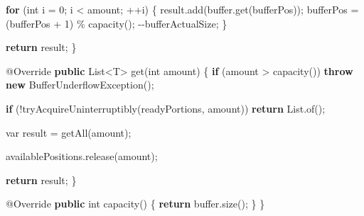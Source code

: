 \documentclass[11pt]{article}
\newenvironment{Shaded}{}{}
\newcommand{\KeywordTok}[1]{\textcolor[rgb]{0.00,0.44,0.13}{\textbf{{#1}}}}
\newcommand{\DataTypeTok}[1]{\textcolor[rgb]{0.56,0.13,0.00}{{#1}}}
\newcommand{\DecValTok}[1]{\textcolor[rgb]{0.25,0.63,0.44}{{#1}}}
\newcommand{\FunctionTok}[1]{\textcolor[rgb]{0.02,0.16,0.49}{{#1}}}
\newcommand{\NormalTok}[1]{{#1}}
\newcommand{\ControlFlowTok}[1]{\textcolor[rgb]{0.00,0.44,0.13}{\textbf{{#1}}}}
\newcommand{\OperatorTok}[1]{\textcolor[rgb]{0.40,0.40,0.40}{{#1}}}
\newcommand{\BuiltInTok}[1]{{#1}}
\newcommand{\AttributeTok}[1]{\textcolor[rgb]{0.49,0.56,0.16}{{#1}}}
\begin{document}
\begin{Shaded}
\begin{Highlighting}[]
        \ControlFlowTok{for} \OperatorTok{(}\DataTypeTok{int}\NormalTok{ i }\OperatorTok{=} \DecValTok{0}\OperatorTok{;}\NormalTok{ i }\OperatorTok{\textless{}}\NormalTok{ amount}\OperatorTok{;} \OperatorTok{++}\NormalTok{i}\OperatorTok{)} \OperatorTok{\{}
\NormalTok{            result}\OperatorTok{.}\FunctionTok{add}\OperatorTok{(}\NormalTok{buffer}\OperatorTok{.}\FunctionTok{get}\OperatorTok{(}\NormalTok{bufferPos}\OperatorTok{));}
\NormalTok{            bufferPos }\OperatorTok{=} \OperatorTok{(}\NormalTok{bufferPos }\OperatorTok{+} \DecValTok{1}\OperatorTok{)} \OperatorTok{\%} \FunctionTok{capacity}\OperatorTok{();}
            \OperatorTok{{-}{-}}\NormalTok{bufferActualSize}\OperatorTok{;}
        \OperatorTok{\}}

        \ControlFlowTok{return}\NormalTok{ result}\OperatorTok{;}
    \OperatorTok{\}}

    \AttributeTok{@Override}
    \KeywordTok{public} \BuiltInTok{List}\OperatorTok{\textless{}}\NormalTok{T}\OperatorTok{\textgreater{}} \FunctionTok{get}\OperatorTok{(}\DataTypeTok{int}\NormalTok{ amount}\OperatorTok{)} \OperatorTok{\{}
        \ControlFlowTok{if} \OperatorTok{(}\NormalTok{amount }\OperatorTok{\textgreater{}} \FunctionTok{capacity}\OperatorTok{())}
            \ControlFlowTok{throw} \KeywordTok{new} \BuiltInTok{BufferUnderflowException}\OperatorTok{();}

        \ControlFlowTok{if} \OperatorTok{(!}\FunctionTok{tryAcquireUninterruptibly}\OperatorTok{(}\NormalTok{readyPortions}\OperatorTok{,}\NormalTok{ amount}\OperatorTok{))}
            \ControlFlowTok{return} \BuiltInTok{List}\OperatorTok{.}\FunctionTok{of}\OperatorTok{();}

        \DataTypeTok{var}\NormalTok{ result }\OperatorTok{=} \FunctionTok{getAll}\OperatorTok{(}\NormalTok{amount}\OperatorTok{);}

\NormalTok{        availablePositions}\OperatorTok{.}\FunctionTok{release}\OperatorTok{(}\NormalTok{amount}\OperatorTok{);}

        \ControlFlowTok{return}\NormalTok{ result}\OperatorTok{;}
    \OperatorTok{\}}

    \AttributeTok{@Override}
    \KeywordTok{public} \DataTypeTok{int} \FunctionTok{capacity}\OperatorTok{()} \OperatorTok{\{}
        \ControlFlowTok{return}\NormalTok{ buffer}\OperatorTok{.}\FunctionTok{size}\OperatorTok{();}
    \OperatorTok{\}}
\OperatorTok{\}}
\end{Highlighting}
\end{Shaded}
\end{document}
